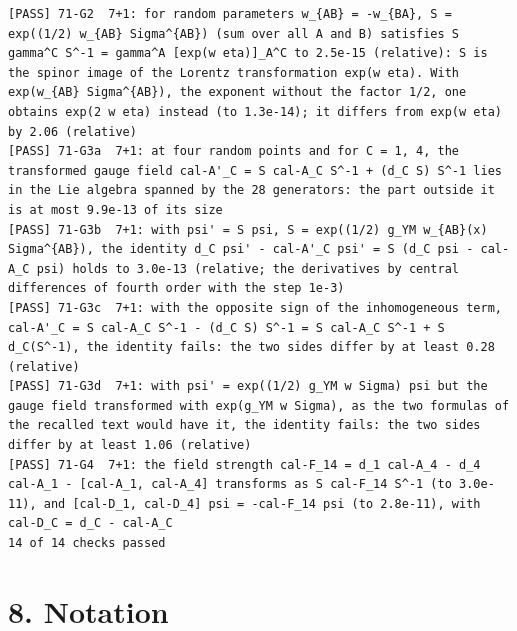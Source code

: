 \documentclass[
  10pt,
]{article}
\begin{document}
\begin{verbatim}
[PASS] 71-G2  7+1: for random parameters w_{AB} = -w_{BA}, S = exp((1/2) w_{AB} Sigma^{AB}) (sum over all A and B) satisfies S gamma^C S^-1 = gamma^A [exp(w eta)]_A^C to 2.5e-15 (relative): S is the spinor image of the Lorentz transformation exp(w eta). With exp(w_{AB} Sigma^{AB}), the exponent without the factor 1/2, one obtains exp(2 w eta) instead (to 1.3e-14); it differs from exp(w eta) by 2.06 (relative)
[PASS] 71-G3a  7+1: at four random points and for C = 1, 4, the transformed gauge field cal-A'_C = S cal-A_C S^-1 + (d_C S) S^-1 lies in the Lie algebra spanned by the 28 generators: the part outside it is at most 9.9e-13 of its size
[PASS] 71-G3b  7+1: with psi' = S psi, S = exp((1/2) g_YM w_{AB}(x) Sigma^{AB}), the identity d_C psi' - cal-A'_C psi' = S (d_C psi - cal-A_C psi) holds to 3.0e-13 (relative; the derivatives by central differences of fourth order with the step 1e-3)
[PASS] 71-G3c  7+1: with the opposite sign of the inhomogeneous term, cal-A'_C = S cal-A_C S^-1 - (d_C S) S^-1 = S cal-A_C S^-1 + S d_C(S^-1), the identity fails: the two sides differ by at least 0.28 (relative)
[PASS] 71-G3d  7+1: with psi' = exp((1/2) g_YM w Sigma) psi but the gauge field transformed with exp(g_YM w Sigma), as the two formulas of the recalled text would have it, the identity fails: the two sides differ by at least 1.06 (relative)
[PASS] 71-G4  7+1: the field strength cal-F_14 = d_1 cal-A_4 - d_4 cal-A_1 - [cal-A_1, cal-A_4] transforms as S cal-F_14 S^-1 (to 3.0e-11), and [cal-D_1, cal-D_4] psi = -cal-F_14 psi (to 2.8e-11), with cal-D_C = d_C - cal-A_C
14 of 14 checks passed
\end{verbatim}

\hypertarget{notation}{%
\section{8. Notation}\label{notation}}
\end{document}
